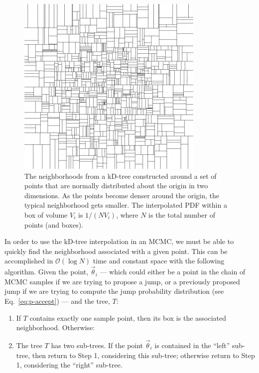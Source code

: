 \documentclass[prd,preprint]{revtex4}
\newcommand{\vtheta}{\vec{\theta}}
\newcommand{\order}[1]{\mathcal{O}\left( #1 \right)}
\begin{document}
\begin{figure}
  \begin{center}
    \includegraphics[width=0.8\textwidth]{kdtree.png}
  \end{center}
  \caption{\label{fig:kD-tree} The neighborhoods from a kD-tree
    constructed around a set of points that are normally distributed
    about the origin in two dimensions.  As the points become denser
    around the origin, the typical neighborhood gets smaller.  The
    interpolated PDF within a box of volume $V_i$ is $1/(N V_i)$,
    where $N$ is the total number of points (and boxes).}
\end{figure}

In order to use the kD-tree interpolation in an MCMC, we must be able
to quickly find the neighborhood associated with a given point.  This
can be accomplished in $\order{\log N}$ time and constant space with
the following algorithm.  Given the point, $\vtheta_i$ --- which could
either be a point in the chain of MCMC samples if we are trying to
propose a jump, or a previously proposed jump if we are trying to
compute the jump probability distribution (see
Eq.~\ref{eq:p-accept}) --- and the tree, $T$:
\begin{enumerate}
\item If $T$ contains exactly one sample point, then its box is the
  associated neighborhood.  Otherwise:
\item The tree $T$ has two sub-trees.  If the point $\vtheta_i$ is
  contained in the ``left'' sub-tree, then return to Step 1,
  considering this sub-tree; otherwise return to Step 1, considering
  the ``right'' sub-tree.
\end{enumerate}
\end{document}
